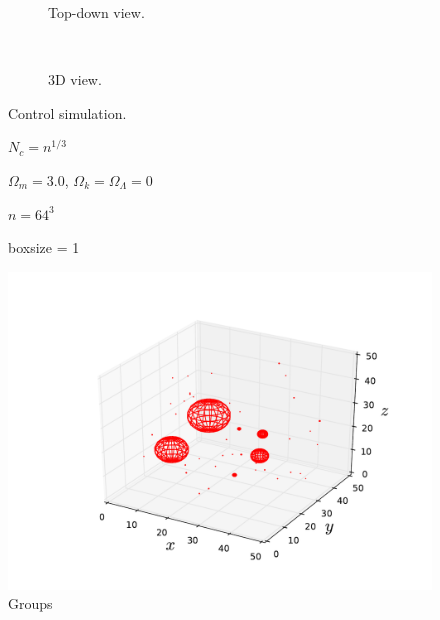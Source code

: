 \documentclass[10pt]{article}
\begin{document}
\begin{figure}[htbp]
\centering
\begin{subfigure}{\textwidth}
\centering

\caption{Top-down view.}
\end{subfigure} \\
\begin{subfigure}{\textwidth}
\centering

\caption{3D view.}
\end{subfigure}
\caption{Control simulation.}
\end{figure}

\begin{figure}[htbp]
\centering

\end{figure}

\begin{figure}[htbp]
\centering

\caption{$N_c = n^{1/3}$}
\end{figure}

\begin{figure}[htbp]
\centering

\caption{$\Omega_m = 3.0$, $\Omega_k = \Omega_\Lambda = 0$}
\end{figure}

\begin{figure}[htbp]
\centering

\caption{$n = 64^3$}
\end{figure}

\begin{figure}[htbp]
\centering

\caption{boxsize = 1}
\end{figure}

\begin{figure}[htbp]
\centering

\includegraphics{Control_Groups.pdf}
\caption{Groups}
\label{fig:groups}
\end{figure}
\end{document}
